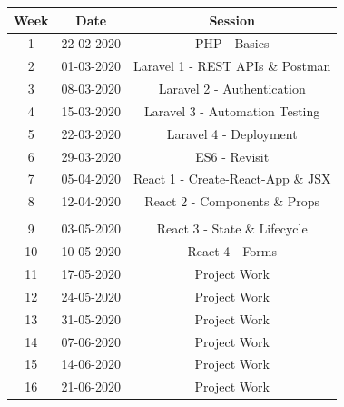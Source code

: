 \documentclass{article}
\begin{document}
\renewcommand{\arraystretch}{1.5}
\begin{tabular}{|c|c|c|c|}
	\hline
	\textbf{Week} & \textbf{Date}     & \multicolumn{2}{c|}{\textbf{Session}}        \\ \hline
	\small 1      & \small 22-02-2020 & \multicolumn{2}{c|}{\small PHP - Basics} \\ \hline
	\small 2      & \small 01-03-2020 & \multicolumn{2}{c|}{\small Laravel 1 - REST APIs \& Postman} \\ \hline
	\small 3      & \small 08-03-2020 & \multicolumn{2}{c|}{\small Laravel 2 - Authentication}          \\ \hline
	\small 4      & \small 15-03-2020 & \multicolumn{2}{c|}{\small Laravel 3 - Automation Testing}            \\ \hline
	\small 5      & \small 22-03-2020 & \multicolumn{2}{c|}{\small Laravel 4 - Deployment}   \\ \hline
	\small 6      & \small 29-03-2020 & \multicolumn{2}{c|}{\small ES6 - Revisit}            \\ \hline
	\small 7      & \small 05-04-2020 & \multicolumn{2}{c|}{\small React 1 - Create-React-App \& JSX}            \\ \hline
	\small 8      & \small 12-04-2020 & \multicolumn{2}{c|}{\small React 2 - Components \& Props}       \\ \hline
	\rowcolor{yellow} \multicolumn{4}{|c|}{\small Mid Term Break}                    \\ \hline
	\small 9      & \small 03-05-2020 & \multicolumn{2}{c|}{\small React 3 - State \& Lifecycle}            \\ \hline
	\small 10     & \small 10-05-2020 & \multicolumn{2}{c|}{\small React 4 - Forms}     \\ \hline
	\small 11     & \small 17-05-2020 & \multicolumn{2}{c|}{\small Project Work}     \\ \hline
	\small 12     & \small 24-05-2020 & \multicolumn{2}{c|}{\small Project Work}     \\ \hline
	\small 13     & \small 31-05-2020 & \multicolumn{2}{c|}{\small Project Work}     \\ \hline
	\small 14     & \small 07-06-2020 & \multicolumn{2}{c|}{\small Project Work}     \\ \hline
	\small 15     & \small 14-06-2020 & \multicolumn{2}{c|}{\small Project Work}     \\ \hline
	\small 16     & \small 21-06-2020 & \multicolumn{2}{c|}{\small Project Work}     \\ \hline
\end{tabular}
\end{document}
